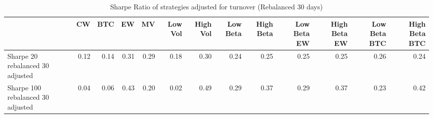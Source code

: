\begin{table}
\centering
\caption{Sharpe Ratio of strategies adjusted for turnover (Rebalanced 30 days)}
\label{sharpe30}
\begin{tabular}{lrrrrrrrrrrrr}
\toprule
{} &   CW &  BTC &   EW &   MV &  Low Vol &  High Vol &  Low Beta &  High Beta &  Low Beta EW &  High Beta EW &  Low Beta BTC &  High Beta BTC \\
\midrule
Sharpe 20 rebalanced 30 adjusted  & 0.12 & 0.14 & 0.31 & 0.29 &     0.18 &      0.30 &      0.24 &       0.25 &         0.25 &          0.25 &          0.26 &           0.24 \\
Sharpe 100 rebalanced 30 adjusted & 0.04 & 0.06 & 0.43 & 0.20 &     0.02 &      0.49 &      0.29 &       0.37 &         0.29 &          0.37 &          0.23 &           0.42 \\
\bottomrule
\end{tabular}
\end{table}
